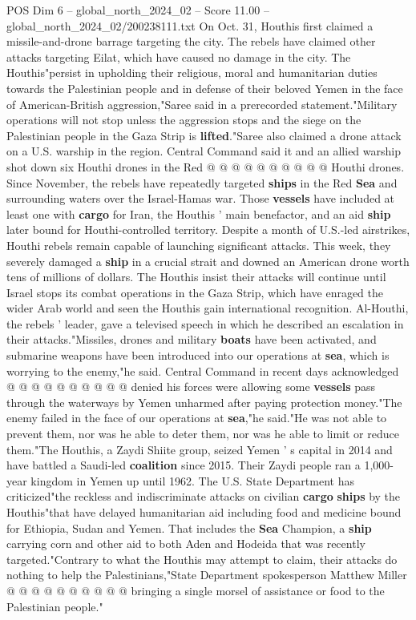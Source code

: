 \begin{textsample}{POS Dim 6 – global\_north\_2024\_02 – Score 11.00 – global\_north\_2024\_02/200238111.txt}
On Oct. 31, Houthis first claimed a missile-and-drone barrage targeting the city.
The rebels have claimed other attacks targeting Eilat, which have caused no damage in the city.
The Houthis"persist in upholding their religious, moral and humanitarian duties towards the Palestinian people and in defense of their beloved Yemen in the face of American-British aggression,"Saree said in a prerecorded statement."Military operations will not stop unless the aggression stops and the siege on the Palestinian people in the Gaza Strip is \textbf{lifted}."Saree also claimed a drone attack on a U.S. warship in the region.
Central Command said it and an allied warship shot down six Houthi drones in the Red @ @ @ @ @ @ @ @ @ @ Houthi drones.
Since November, the rebels have repeatedly targeted \textbf{ships} in the Red \textbf{Sea} and surrounding waters over the Israel-Hamas war.
Those \textbf{vessels} have included at least one with \textbf{cargo} for Iran, the Houthis ' main benefactor, and an aid \textbf{ship} later bound for Houthi-controlled territory.
Despite a month of U.S.-led airstrikes, Houthi rebels remain capable of launching significant attacks.
This week, they severely damaged a \textbf{ship} in a crucial strait and downed an American drone worth tens of millions of dollars.
The Houthis insist their attacks will continue until Israel stops its combat operations in the Gaza Strip, which have enraged the wider Arab world and seen the Houthis gain international recognition.
Al-Houthi, the rebels ' leader, gave a televised speech in which he described an escalation in their attacks."Missiles, drones and military \textbf{boats} have been activated, and submarine weapons have been introduced into our operations at \textbf{sea}, which is worrying to the enemy,"he said.
Central Command in recent days acknowledged @ @ @ @ @ @ @ @ @ @ denied his forces were allowing some \textbf{vessels} pass through the waterways by Yemen unharmed after paying protection money."The enemy failed in the face of our operations at \textbf{sea},"he said."He was not able to prevent them, nor was he able to deter them, nor was he able to limit or reduce them."The Houthis, a Zaydi Shiite group, seized Yemen ' s capital in 2014 and have battled a Saudi-led \textbf{coalition} since 2015.
Their Zaydi people ran a 1,000-year kingdom in Yemen up until 1962.
The U.S.
State Department has criticized"the reckless and indiscriminate attacks on civilian \textbf{cargo} \textbf{ships} by the Houthis"that have delayed humanitarian aid including food and medicine bound for Ethiopia, Sudan and Yemen.
That includes the \textbf{Sea} Champion, a \textbf{ship} carrying corn and other aid to both Aden and Hodeida that was recently targeted."Contrary to what the Houthis may attempt to claim, their attacks do nothing to help the Palestinians,"State Department spokesperson Matthew Miller @ @ @ @ @ @ @ @ @ @ bringing a single morsel of assistance or food to the Palestinian people."

\end{textsample}

